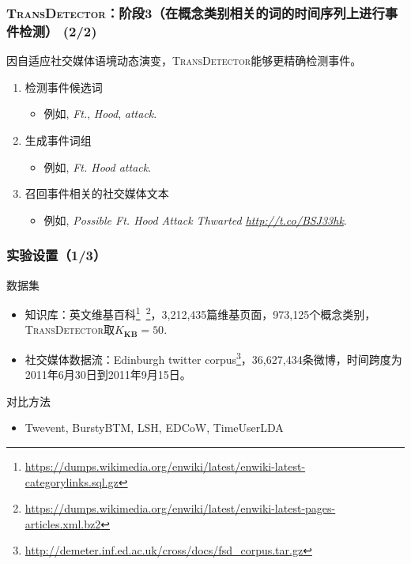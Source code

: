 \begin{frame}
\frametitle{\textsc{TransDetector}：阶段3（在概念类别相关的词的时间序列上进行事件检测） (2/2)}
因自适应社交媒体语境动态演变，\textsc{TransDetector}能够更精确检测事件。
\begin{enumerate}
	\item 检测事件候选词
	\begin{itemize}
		\item 例如, \textit{Ft.}, \textit{Hood}, \textit{attack}.
	\end{itemize}
	\item 生成事件词组
	\begin{itemize}
		\item 例如, \textit{Ft. Hood attack}.
	\end{itemize}
	\item 召回事件相关的社交媒体文本
	\begin{itemize}
		\item 例如, \textit{Possible Ft. Hood Attack Thwarted \url{http://t.co/BSJ33hk}}.
	\end{itemize}
\end{enumerate}
\end{frame}


\begin{frame}
\frametitle{实验设置（1/3）}
\noindent 数据集
\begin{itemize}
	\item 知识库：英文维基百科\footnote{\tiny{\url{https://dumps.wikimedia.org/enwiki/latest/enwiki-latest-categorylinks.sql.gz}}}\ \footnote{\tiny{\url{https://dumps.wikimedia.org/enwiki/latest/enwiki-latest-pages-articles.xml.bz2}}}，3,212,435篇维基页面，973,125个概念类别，\textsc{TransDetector}取$K_{\bm{KB}}=50$.
	\item 社交媒体数据流：Edinburgh twitter corpus\footnote{\tiny{\url{http://demeter.inf.ed.ac.uk/cross/docs/fsd_corpus.tar.gz}}}，36,627,434条微博，时间跨度为2011年6月30日到2011年9月15日。
\end{itemize} 
对比方法
\begin{itemize}
	\item Twevent, BurstyBTM, LSH, EDCoW, TimeUserLDA
\end{itemize}
\end{frame}

